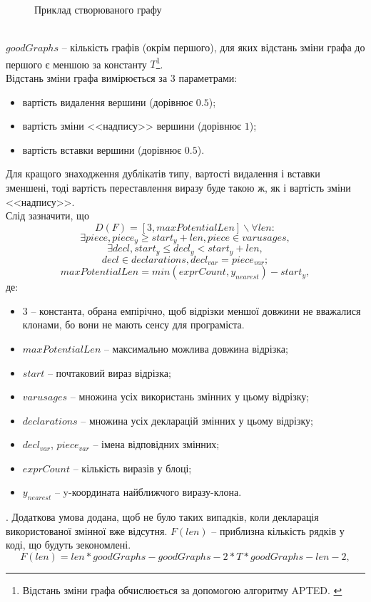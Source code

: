 \documentclass[a4paper, 14pt]{article}
\newcommand{\RNum}[1]{\uppercase\expandafter{\romannumeral #1\relax}}
\begin{document}
\begin{itemize}
{\begin{enumerate}
{\begin{figure}[h]
    \caption{Приклад створюваного графу}
    \label{fig:}
\end{figure} \\
$goodGraphs$ -- кількість графів (окрім першого), для яких відстань зміни графа до першого є меншою за константу $T$\footnote{Відстань зміни графа обчислюється за допомогою алгоритму APTED. \cite{Pawlik15}\cite{Pawlik16}}. \\
Відстань зміни графа вимірюється за 3 параметрами: 
\begin{itemize}
\item вартість видалення вершини (дорівнює $0.5$);
\item вартість зміни <<надпису>> вершини (дорівнює $1$);
\item вартість вставки вершини (дорівнює $0.5$).
\end{itemize}
Для кращого знаходження дублікатів \RNum{3} типу, вартості видалення і вставки зменшені, 
тоді вартість переставлення виразу буде такою ж, як і вартість зміни <<надпису>>.\\
Слід зазначити, що $$D(F)=[3, maxPotentialLen] \backslash \forall len: $$
$$\exists piece, piece_y \geq start_y+len, piece \in varusages, $$
$$\exists decl, start_{y} \leq decl_{y} < start_{y}+len, $$
$$decl \in declarations, decl_{var}=piece_{var};$$
$$maxPotentialLen = min(exprCount, y_{nearest})-start_y,$$ де:
\begin{itemize} 
\item $3$ -- константа, обрана емпірічно, щоб відрізки меншої довжини не вважалися клонами, бо вони не мають сенсу для програміста.
\item $maxPotentialLen$ -- максимально можлива довжина відрізка;
\item $start$ -- почтаковий вираз відрізка;
\item $varusages$ -- множина усіх використань змінних у цьому відрізку;
\item $declarations$ -- множина усіх декларацій змінних у цьому відрізку;
\item $decl_{var}$, $piece_{var}$ -- імена відповідних змінних;
\item $exprCount$ -- кількість виразів у блоці;
\item $y_{nearest}$ -- y-координата найближчого виразу-клона.
\end{itemize}.
Додаткова умова додана, щоб не було таких випадків, коли декларація використованої змінної вже відсутня.
$F(len)$ -- приблизна кількість рядків у коді, що будуть зекономлені.
$$F(len) = len*goodGraphs-goodGraphs-2*T*goodGraphs-len-2,$$ 
}
\end{enumerate}}
\end{itemize}
\end{document}
